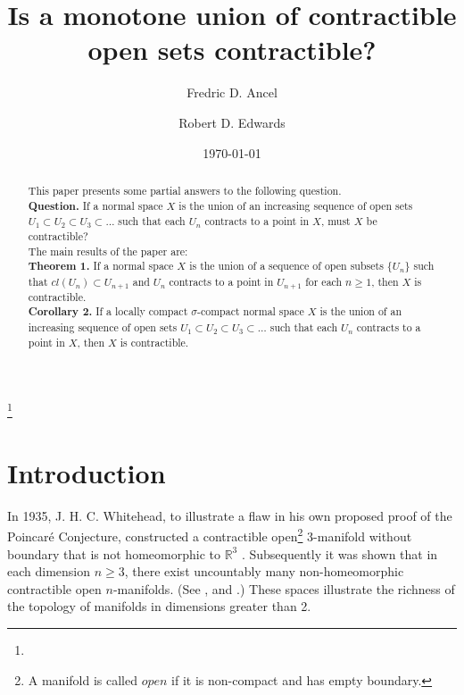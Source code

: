 \documentclass[12pt]{amsart}%
\theoremstyle{plain}
\numberwithin{equation}{section}
\begin{document}
\title[ ]{Is a monotone union of contractible open sets contractible?}

\author{Fredric D. Ancel}

\address{Department of Mathematical Sciences, University of Wisconsin - Milwaukee, Box 413, Milwaukee, WI 53201-0413}


\author{Robert D. Edwards}

\address{Department of Mathematics, UCLA, Box 951555 Los Angeles, CA 90095-1555}


\thanks{}

\date{\today}
\keywords{}

\begin{abstract}
This paper presents some partial answers to the following question.
\\[6pt]
\textbf{Question.} If a normal space $X$ is the union of an increasing sequence of open sets $U_1 \subset U_2 \subset U_3 \subset \dots$ such that each $U_n$ contracts to a point in $X$, must $X$ be contractible?
\\[6pt]
The main results of the paper are:
\\[6pt]
\textbf{Theorem 1.} If a normal space $X$ is the union of a sequence of open subsets $\{U_n\}$ such that $cl(U_n) \subset U_{n+1}$ and $U_n$ contracts to a point in $U_{n+1}$ for each $n \geq 1$, then $X$ is contractible.
\\[6pt]
\textbf{Corollary 2.}  If a locally compact $\sigma$-compact normal space $X$ is the union of an increasing sequence of open sets $U_1 \subset U_2 \subset U_3 \subset \dots$ such that each $U_n$ contracts to a point in $X$, then $X$ is contractible.
\end{abstract}
\maketitle

\section{Introduction}

\renewcommand{\thefootnote}
{\ensuremath{\fnsymbol{footnote}}}
\setcounter{footnote}{2}

\indent In 1935, J. H. C. Whitehead, to illustrate a flaw in his own proposed proof of the Poincar\'{e} Conjecture, constructed a contractible open\footnote{A manifold is called $open$ if it is non-compact and has empty boundary.} 3-manifold without boundary that is not homeomorphic to $\mathbb{R}^3$ \cite{7}.  Subsequently it was shown that in each dimension $n \geq 3$, there exist uncountably many non-homeomorphic contractible open $n$-manifolds.  (See \cite{5}, \cite{1} and \cite{3}.)  These spaces illustrate the richness of the topology of manifolds in dimensions greater than 2. 
\end{document}
